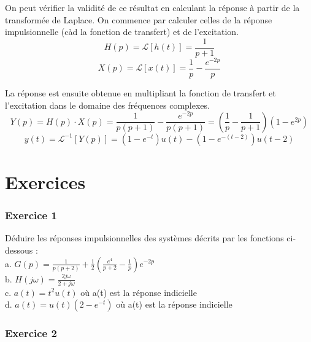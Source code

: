 	\vspace{1\baselineskip}
	
	On peut vérifier la validité de ce résultat en calculant la réponse à partir de la transformée de Laplace. On commence par calculer celles de la réponse impulsionnelle (càd la fonction de transfert) et de l'excitation.
	\begin{equation}\label{key}
	H(p)=\mathcal{L}[h(t)]=\frac{1}{p+1}
	\end{equation}
	\begin{equation}\label{key}
	X(p)=\mathcal{L}[x(t)]=\frac{1}{p}-\frac{e^{-2p}}{p}
	\end{equation}
	
	La réponse est ensuite obtenue en multipliant la fonction de transfert et l'excitation dans le domaine des fréquences complexes.
	\begin{equation*}
	Y(p)=H(p)\cdot X(p)=\frac{1}{p(p+1)}-\frac{e^{-2p}}{p(p+1)}=(\frac{1}{p}-\frac{1}{p+1})(1-e^{2p})
	\end{equation*}
	\begin{equation*}
	y(t)=\mathcal{L}^{-1}[Y(p)]=(1-e^{-t})u(t)-(1-e^{-(t-2)})u(t-2)
	\end{equation*}
	
	\vspace{1\baselineskip}
	
	
	
	\section{Exercices}
	
	\subsubsection{Exercice 1}
	
	Déduire les réponses impulsionnelles des systèmes décrits par les fonctions ci-dessous :\\
	a. $G(p)=\frac{1}{p(p+2)}+\frac{1}{2}(\frac{e^{4}}{p+2}-\frac{1}{p})e^{-2p}$ \\
	b. $H(j\omega)=\frac{2j\omega}{2+j\omega}$\\
	c. $a(t)=t^{2}u(t)$ où a(t) est la réponse indicielle \\
	d. $a(t)=u(t)(2-e^{-t})$ où a(t) est la réponse indicielle\\
	
	\subsubsection{Exercice 2}
	
